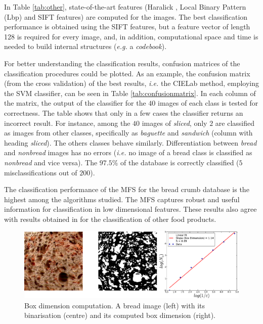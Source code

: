 \documentclass[spanish,a4paper,openright,11pt]{book}
\begin{document}
In Table \ref{tab:other}, state-of-the-art features (Haralick \cite{Haralick73}, Local Binary Pattern (Lbp) \cite{Ojala96} and SIFT \cite{Lowe2004} features) are computed for the images. The best classification performance is obtained using the SIFT features, but a feature vector of length 128 is required for every image, and, in addition, computational space and time is needed to build internal structures ({\em e.g.} a {\em codebook}). 

For better understanding the classification results, confusion matrices of the classification procedures could be plotted. As an example, the confusion matrix (from the cross validation) of the best results, {\em i.e.} the CIELab method, employing the SVM classifier, can be seen in Table \ref{tab:confusionmatrix}. In each column of the matrix, the output of the classifier for the $40$ images of each class is tested for correctness. The table shows that only in a few cases the classifier returns an incorrect result. For instance, among the $40$ images of {\em sliced}, only $2$ are  classified as images from other classes, specifically as {\em baguette} and {\em sandwich} (column with heading {\em sliced}). The others classes behave similarly. Differentiation between {\em bread} and {\em nonbread} images has no errors ({\em i.e.} no image of a bread class is classified as {\em nonbread} and vice versa). The $97.5\%$ of the database is correctly classified ($5$ misclassifications out of $200$).

The classification performance of the MFS for the bread crumb database is the highest a\-mong the algorithms studied. The MFS captures robust and useful information for classification in low dimensional features. These results also agree with results obtained in \cite{Bosch2011} for the classification of other food products.

\begin{figure}[h!]
\centering
\includegraphics{dimensionbox}
\caption{Box dimension computation. A bread image (left) with its binarisation (centre) and its computed box dimension (right).}
\label{fig:fitbox}
\end{figure}
\end{document}
